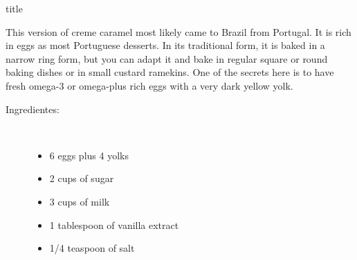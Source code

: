 \documentclass [11pt, letterpaper] {article}
\begin{document}
 {title}


\vspace{0.4 in}
This version of creme caramel most likely came to Brazil from
Portugal. It is rich in eggs as most Portuguese desserts. In its
traditional form, it is baked in a narrow ring form, but you can adapt
it and bake in regular square or round baking dishes or in small
custard ramekins. One of the secrets here is to have fresh omega-3 or omega-plus rich eggs with a very dark yellow yolk.

\vspace{0.3in}

\begin{description}

\item[Ingredientes:]\ \\
	\begin{itemize}
	\item 6 eggs plus 4 yolks
	\item 2 cups of sugar 
	\item 3 cups of milk
	\item 1 tablespoon of vanilla extract
	\item 1/4 teaspoon of salt
	\end{itemize}


\end{description}
\end{document}
